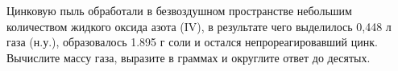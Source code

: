 
Цинковую
пыль обработали в безвоздушном пространстве небольшим количеством жидкого
оксида азота (IV), в результате чего выделилось 0,448 л газа (н.у.),
образовалось 1.895 г соли и остался непрореагировавший цинк. Вычислите массу
газа, выразите в граммах и округлите ответ до десятых.



